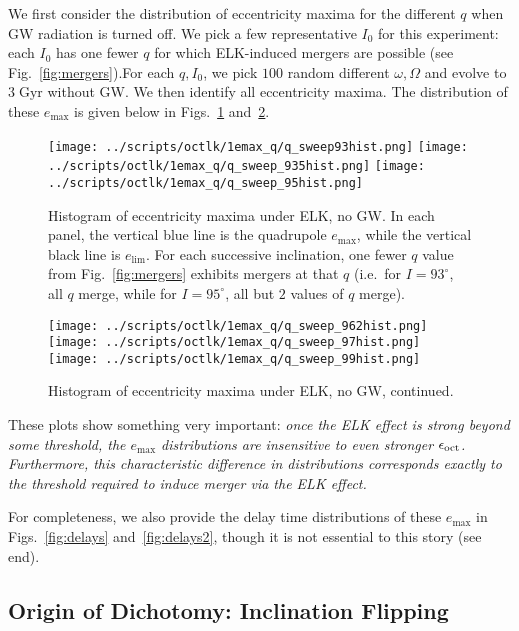 \documentclass[11pt,
        usenames, %
        dvipsnames %
    ]{article}
\begin{document}
We first consider the distribution of eccentricity maxima for the different $q$
when GW radiation is turned off. We pick a few representative $I_0$ for this
experiment: each $I_0$ has one fewer $q$ for which ELK-induced mergers are
possible (see Fig.~\ref{fig:mergers}).For each $q, I_0$, we pick $100$ random
different $\omega, \Omega$ and evolve to $3\;\mathrm{Gyr}$ without GW\@. We then
identify all eccentricity maxima. The distribution of these $e_{\max}$ is
given below in Figs.~\ref{fig:hists} and~\ref{fig:hists2}.
\begin{figure}
    \centering
    \texttt{[image: ../scripts/octlk/1emax\_q/q\_sweep93hist.png]}
    \texttt{[image: ../scripts/octlk/1emax\_q/q\_sweep\_935hist.png]}
    \texttt{[image: ../scripts/octlk/1emax\_q/q\_sweep\_95hist.png]}
    \caption{Histogram of eccentricity maxima under ELK, no GW\@. In each panel,
    the vertical blue line is the quadrupole $e_{\max}$, while the vertical
    black line is $e_{\lim}$. For each successive inclination, one fewer $q$
    value from Fig.~\ref{fig:mergers} exhibits mergers at that $q$ (i.e.\ for $I
    = 93^\circ$, all $q$ merge, while for $I = 95^\circ$, all but $2$ values of
    $q$ merge).}\label{fig:hists}
\end{figure}
\begin{figure}
    \centering
    \texttt{[image: ../scripts/octlk/1emax\_q/q\_sweep\_962hist.png]}
    \texttt{[image: ../scripts/octlk/1emax\_q/q\_sweep\_97hist.png]}
    \texttt{[image: ../scripts/octlk/1emax\_q/q\_sweep\_99hist.png]}
    \caption{Histogram of eccentricity maxima under ELK, no GW,
    continued.}\label{fig:hists2}
\end{figure}

These plots show something very important: \emph{once the ELK effect is
strong beyond some threshold, the $e_{\max}$ distributions are insensitive to
even stronger $\epsilon_{\rm oct}$. Furthermore, this characteristic difference
in distributions corresponds exactly to the threshold required to induce merger
via the ELK effect.}

For completeness, we also provide the delay time distributions of these
$e_{\max}$ in Figs.~\ref{fig:delays} and~\ref{fig:delays2}, though it is not
essential to this story (see end).

\subsection{Origin of Dichotomy: Inclination Flipping}
\end{document}
